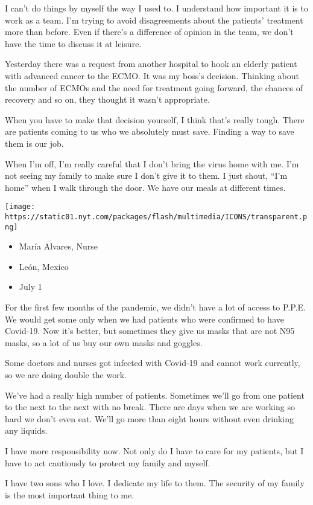 I can't do things by myself the way I used to. I understand how
important it is to work as a team. I'm trying to avoid disagreements
about the patients' treatment more than before. Even if there's a
difference of opinion in the team, we don't have the time to discuss it
at leisure.

Yesterday there was a request from another hospital to hook an elderly
patient with advanced cancer to the ECMO. It was my boss's decision.
Thinking about the number of ECMOs and the need for treatment going
forward, the chances of recovery and so on, they thought it wasn't
appropriate.

When you have to make that decision yourself, I think that's really
tough. There are patients coming to us who we absolutely must save.
Finding a way to save them is our job.

When I'm off, I'm really careful that I don't bring the virus home with
me. I'm not seeing my family to make sure I don't give it to them. I
just shout, ``I'm home'' when I walk through the door. We have our meals
at different times.

\texttt{[image: https://static01.nyt.com/packages/flash/multimedia/ICONS/transparent.png]}

\begin{itemize}
\tightlist
\item
  María Alvares, Nurse
\item
  León, Mexico
\item
  July 1
\end{itemize}

For the first few months of the pandemic, we didn't have a lot of access
to P.P.E. We would get some only when we had patients who were confirmed
to have Covid-19. Now it's better, but sometimes they give us masks that
are not N95 masks, so a lot of us buy our own masks and goggles.

Some doctors and nurses got infected with Covid-19 and cannot work
currently, so we are doing double the work.

We've had a really high number of patients. Sometimes we'll go from one
patient to the next to the next with no break. There are days when we
are working so hard we don't even eat. We'll go more than eight hours
without even drinking any liquids.

I have more responsibility now. Not only do I have to care for my
patients, but I have to act cautiously to protect my family and myself.

I have two sons who I love. I dedicate my life to them. The security of
my family is the most important thing to me.


